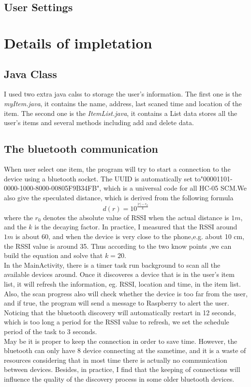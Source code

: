 \documentclass{article}
\begin{document}
\subsection{User Settings}

\section{Details of impletation}
\subsection{Java Class}
I used two extra java calss to storage the user's information. The first one is the \emph{myItem.java}, it contains the name, address, last scaned time and location of the item. The second one is the \emph{ItemList.java}, it contains a List data stores all the user's items and several methods including add and delete data.
\subsection{The bluetooth communication}
When user select one item, the program will try to start a connection to the device using a bluetooth socket. The UUID is automatically set to"00001101-0000-1000-8000-00805F9B34FB", which is a universal code for all HC-05  SCM.We also give the speculated distance, which is derived from the following formula
\[d(r)=10^{\frac{|r|-r_0}{k}}\]
where the $r_0$ denotes the absolute value of RSSI when the actual distance is $1 m$, and the $k$ is the decaying factor. In practice, I measured that the RSSI around $1 m$ is about 60, and when the device is very close to the phone,e.g. about 10 cm, the RSSI value is around 35. Thus according to the two know points ,we can build the equation and solve that $k=20$. \\
In the MainActivity, there is a timer task run background to scan all the available devices around. Once it discoveres a device that is in the user's item list, it will refresh the information, eg. RSSI, location and time, in the item list. Also, the scan progress also will check whether the device is too far from the user, and if true, the program will send a message to Raspberry to alert the user. Noticing that the bluetooth discovery will automatically restart in 12 seconds, which is too long a period for the RSSI value to refresh, we set the schedule period of the task to 3 seconds.\\ 
May be it is proper to keep the connection in order to save time. However, the bluetooth can only have 8 device connecting at the sametime, and it is a waste of resources considering that in most time there is actually no communication between devices. Besides, in practice, I find that the keeping of connections will influence the quality of the discovery process in some older bluetooth devices. 
\end{document}

